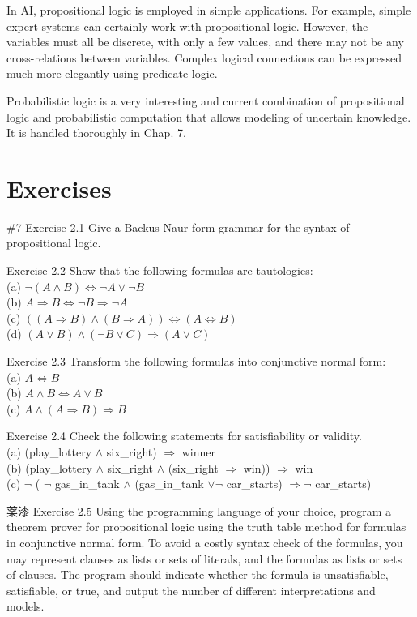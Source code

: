 \documentclass[10pt]{book}
\begin{document}
In AI, propositional logic is employed in simple applications. For example, simple expert systems can certainly work with propositional logic. However, the variables must all be discrete, with only a few values, and there may not be any cross-relations between variables. Complex logical connections can be expressed much more elegantly using predicate logic.

Probabilistic logic is a very interesting and current combination of propositional logic and probabilistic computation that allows modeling of uncertain knowledge. It is handled thoroughly in Chap. 7.

\section{Exercises}
\#7 Exercise 2.1 Give a Backus-Naur form grammar for the syntax of propositional logic.

Exercise 2.2 Show that the following formulas are tautologies:\\
(a) $\neg(A \wedge B) \Leftrightarrow \neg A \vee \neg B$\\
(b) $A \Rightarrow B \Leftrightarrow \neg B \Rightarrow \neg A$\\
(c) $((A \Rightarrow B) \wedge(B \Rightarrow A)) \Leftrightarrow(A \Leftrightarrow B)$\\
(d) $(A \vee B) \wedge(\neg B \vee C) \Rightarrow(A \vee C)$

Exercise 2.3 Transform the following formulas into conjunctive normal form:\\
(a) $A \Leftrightarrow B$\\
(b) $A \wedge B \Leftrightarrow A \vee B$\\
(c) $A \wedge(A \Rightarrow B) \Rightarrow B$

Exercise 2.4 Check the following statements for satisfiability or validity.\\
(a) (play\_lottery $\wedge$ six\_right) $\Rightarrow$ winner\\
(b) (play\_lottery $\wedge$ six\_right $\wedge$ (six\_right $\Rightarrow$ win)) $\Rightarrow$ win\\
(c) $\neg$ ( $\neg$ gas\_in\_tank $\wedge$ (gas\_in\_tank $\vee \neg$ car\_starts) $\Rightarrow \neg$ car\_starts)

薬漆 Exercise 2.5 Using the programming language of your choice, program a theorem prover for propositional logic using the truth table method for formulas in conjunctive normal form. To avoid a costly syntax check of the formulas, you may represent clauses as lists or sets of literals, and the formulas as lists or sets of clauses. The program should indicate whether the formula is unsatisfiable, satisfiable, or true, and output the number of different interpretations and models.
\end{document}
